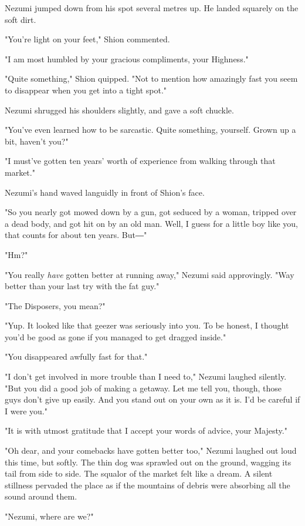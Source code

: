 Nezumi jumped down from his spot several metres up. He landed squarely
on the soft dirt.

"You're light on your feet," Shion commented.

"I am most humbled by your gracious compliments, your Highness."

"Quite something," Shion quipped. "Not to mention how amazingly fast you
seem to disappear when you get into a tight spot."

Nezumi shrugged his shoulders slightly, and gave a soft chuckle.

"You've even learned how to be sarcastic. Quite something, yourself.
Grown up a bit, haven't you?"

"I must've gotten ten years' worth of experience from walking through
that market."

Nezumi's hand waved languidly in front of Shion's face.

"So you nearly got mowed down by a gun, got seduced by a woman, tripped
over a dead body, and got hit on by an old man. Well, I guess for a
little boy like you, that counts for about ten years. But―"

"Hm?"

"You really \emph{have} gotten better at running away," Nezumi said
approvingly. "Way better than your last try with the fat guy."

"The Disposers, you mean?"

"Yup. It looked like that geezer was seriously into you. To be honest, I
thought you'd be good as gone if you managed to get dragged inside."

"You disappeared awfully fast for that."

"I don't get involved in more trouble than I need to," Nezumi laughed
silently. "But you did a good job of making a getaway. Let me tell you,
though, those guys don't give up easily. And you stand out on your own
as it is. I'd be careful if I were you."

"It is with utmost gratitude that I accept your words of advice, your
Majesty."

"Oh dear, and your comebacks have gotten better too," Nezumi laughed out
loud this time, but softly. The thin dog was sprawled out on the ground,
wagging its tail from side to side. The squalor of the market felt like
a dream. A silent stillness pervaded the place as if the mountains of
debris were absorbing all the sound around them.

"Nezumi, where are we?"

